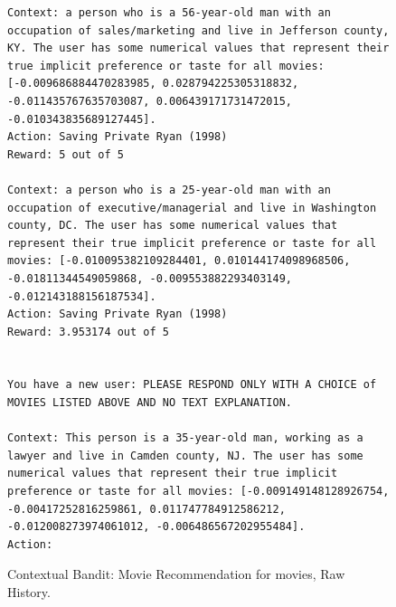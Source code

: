 \begin{figure}[ht]
\begin{lstlisting}[escapechar=!]
Context: a person who is a 56-year-old man with an occupation of sales/marketing and live in Jefferson county, KY. The user has some numerical values that represent their true implicit preference or taste for all movies: [-0.009686884470283985, 0.028794225305318832, -0.011435767635703087, 0.006439171731472015, -0.010343835689127445].
Action: Saving Private Ryan (1998)
Reward: 5 out of 5

Context: a person who is a 25-year-old man with an occupation of executive/managerial and live in Washington county, DC. The user has some numerical values that represent their true implicit preference or taste for all movies: [-0.010095382109284401, 0.010144174098968506, -0.01811344549059868, -0.009553882293403149, -0.012143188156187534].
Action: Saving Private Ryan (1998)
Reward: 3.953174 out of 5


You have a new user: PLEASE RESPOND ONLY WITH A CHOICE of MOVIES LISTED ABOVE AND NO TEXT EXPLANATION.

Context: This person is a 35-year-old man, working as a lawyer and live in Camden county, NJ. The user has some numerical values that represent their true implicit preference or taste for all movies: [-0.009149148128926754, -0.00417252816259861, 0.011747784912586212, -0.012008273974061012, -0.006486567202955484].
Action: 
    \end{lstlisting}
    \caption{Contextual Bandit: Movie Recommendation for movies, Raw History.}
    \label{fig:cb_movie_10_rh}
\end{figure}

